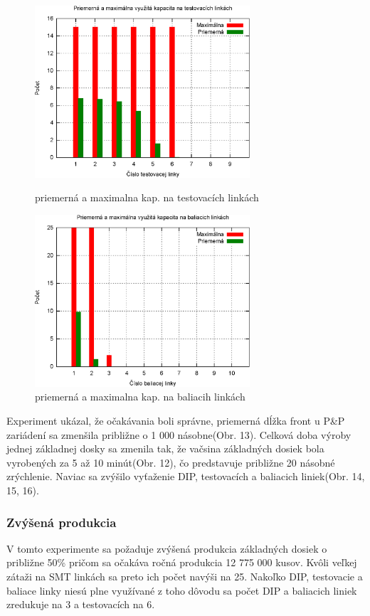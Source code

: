 \documentclass[12pt,a4paper,titlepage,final]{article}
\begin{document}
\begin{figure}[!ht]
  \centering
  \begin{minipage}{0.45\linewidth}
  \centering
  \includegraphics[width=8cm]{doc/2_hist5.eps}
  \caption{priemerná a maximalna kap. na testovacích linkách}
  \end{minipage}
  \quad
  \begin{minipage}{0.45\linewidth}
    \centering
    \includegraphics[width=8cm]{doc/2_hist6.eps}
    \caption{priemerná a maximalna kap. na baliacih linkách}
  \end{minipage}
\end{figure}

\newpage

Experiment ukázal, že očakávania boli správne, priemerná dĺžka front
u P\&P zariádení sa zmenšila približne o 1 000 násobne(Obr. 13). Celková doba
výroby jednej základnej dosky sa zmenila tak, že vačsina základných
dosiek bola vyrobených za 5 až 10 minút(Obr. 12), čo predstavuje približne 
20 násobné zrýchlenie. Naviac sa zvýšilo vyťaženie DIP, testovacích
a baliacich liniek(Obr. 14, 15, 16).

\newpage

\subsubsection{Zvýšená produkcia}
V tomto experimente sa požaduje zvýšená produkcia základných dosiek
o približne 50\% pričom sa očakáva ročná produkcia 12 775 000 kusov.
Kvôli veľkej zátaži na SMT linkách sa preto ich počet navýši na 25.
Nakoľko DIP, testovacie a baliace linky niesú plne využívané z toho
dôvodu sa počet DIP a baliacich liniek zredukuje na 3 a testovacích
na 6. 
\end{document}
